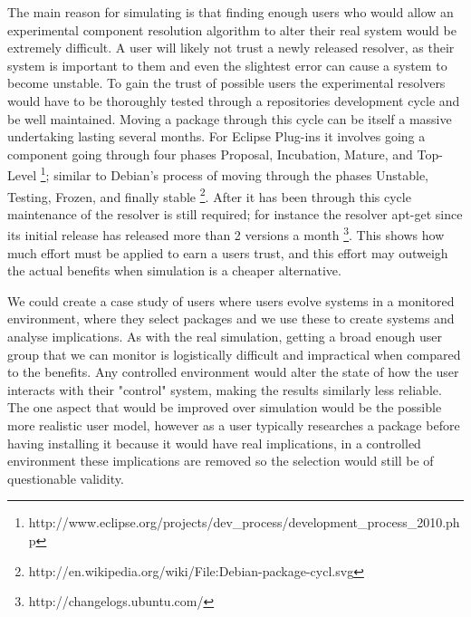 The main reason for simulating is that finding enough users
who would allow an experimental component resolution algorithm to alter their real system would be extremely difficult.
A user will likely not trust a newly released resolver, as their system is important to them and even the slightest error can cause
a system to become unstable. 
To gain the trust of possible users the experimental resolvers would have to be thoroughly tested through a repositories development cycle and be well maintained.
Moving a package through this cycle can be itself a massive undertaking lasting several months. 
For Eclipse Plug-ins it involves going a component going through four phases 
Proposal, Incubation, Mature, and Top-Level \footnote{http://www.eclipse.org/projects/dev\_process/development\_process\_2010.php};
similar to Debian's process of moving through the phases Unstable, Testing, Frozen, and finally stable \footnote{http://en.wikipedia.org/wiki/File:Debian-package-cycl.svg}.
After it has been through this cycle maintenance of the resolver is still required; 
for instance the resolver apt-get since its initial release has released more than 2 versions a month \footnote{http://changelogs.ubuntu.com/}.
This shows how much effort must be applied to earn a users trust, and this effort may outweigh the actual benefits when simulation is a cheaper alternative.

We could create a case study of users where users evolve systems in a monitored environment, where they select packages and we use these to create systems and analyse implications.
As with the real simulation, getting a broad enough user group that we can monitor is logistically difficult and impractical when compared to the benefits.
Any controlled environment would alter the state of how the user interacts with their "control" system, making the results similarly less reliable.
The one aspect that would be improved over simulation would be the possible more realistic user model, 
however as a user typically researches a package before having installing it because it would have real implications, in a controlled environment these implications are removed so the selection would still be of questionable validity.


